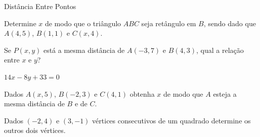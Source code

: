 \begin{exercicios}{Distância Entre Pontos}
    \begin{exercicio}
        Determine $x$ de modo que o triângulo $ABC$ seja retângulo em $B$, sendo dado que $A(4,5)$, $B(1,1)$ e $C(x,4)$.
    \end{exercicio}
    
    \begin{exercicio}
        Se $P(x,y)$ está a mesma distância de $A(-3,7)$ e $B(4,3)$, qual a relação entre $x$ e $y$?
        \begin{answers}
            \tabto{2em} $14x-8y+33=0$
        \end{answers}
    \end{exercicio}

    \begin{exercicio}
        Dados $A(x,5)$, $B(-2,3)$ e $C(4,1)$ obtenha $x$ de modo que $A$ esteja a mesma distância de $B$ e de $C$.
    \end{exercicio}
    
    \begin{exercicio}
        Dados $(-2,4)$ e $(3,-1)$ vértices consecutivos de um quadrado determine os outros dois vértices.
    \end{exercicio}
    
\end{exercicios}

